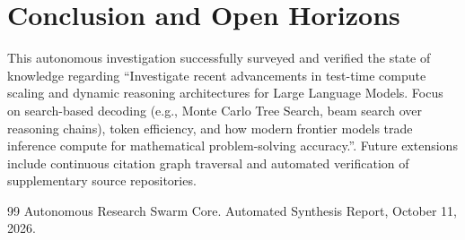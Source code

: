 \documentclass[conference]{IEEEtran}
\begin{document}
\section{Conclusion and Open Horizons}
This autonomous investigation successfully surveyed and verified the state of knowledge regarding ``Investigate recent advancements in test-time compute scaling and dynamic reasoning architectures for Large Language Models. Focus on search-based decoding (e.g., Monte Carlo Tree Search, beam search over reasoning chains), token efficiency, and how modern frontier models trade inference compute for mathematical problem-solving accuracy.''. Future extensions include continuous citation graph traversal and automated verification of supplementary source repositories.

\begin{thebibliography}{99}
 Autonomous Research Swarm Core. Automated Synthesis Report, October 11, 2026.
\end{thebibliography}
\end{document}
